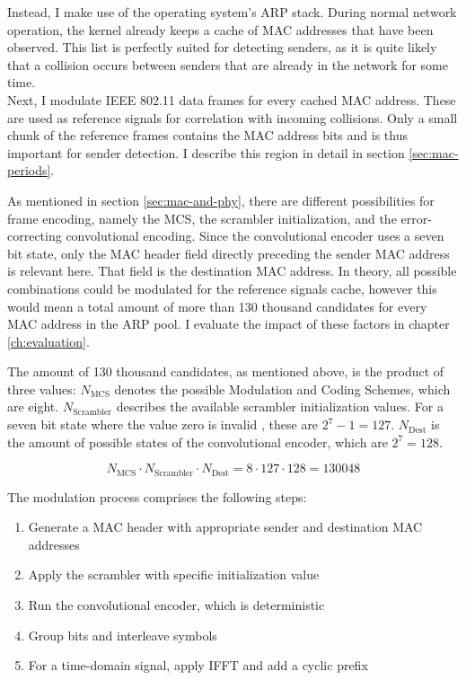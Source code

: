 Instead, I make use of the operating system's \gls{ARP} stack. During normal network operation, the kernel already keeps a cache of \gls{MAC} addresses that have been observed. This list is perfectly suited for detecting senders, as it is quite likely that a collision occurs between senders that are already in the network for some time.\\

Next, I modulate IEEE 802.11 data frames for every cached \gls{MAC} address. These are used as reference signals for correlation with incoming collisions. Only a small chunk of the reference frames contains the \gls{MAC} address bits and is thus important for sender detection. I describe this region in detail in section \ref{sec:mac-periods}.

As mentioned in section \ref{sec:mac-and-phy}, there are different possibilities for frame encoding, namely the \gls{MCS}, the scrambler initialization, and the error-correcting convolutional encoding. Since the convolutional encoder uses a seven bit state, only the \gls{MAC} header field directly preceding the sender \gls{MAC} address is relevant here. That field is the destination \gls{MAC} address. In theory, all possible combinations could be modulated for the reference signals cache, however this would mean a total amount of  more than 130 thousand candidates for every \gls{MAC} address in the ARP pool. I evaluate the impact of these factors in chapter \ref{ch:evaluation}.

The amount of 130 thousand candidates, as mentioned above, is the product of three values: $ N_{\text{MCS}} $ denotes the possible Modulation and Coding Schemes, which are eight. $ N_{\text{Scrambler}} $ describes the available scrambler initialization values. For a seven bit state where the value zero is invalid \cite{ieee2012}, these are $ 2^7 - 1 = 127 $. $ N_{\text{Dest}} $ is the amount of possible states of the convolutional encoder, which are $ 2^7 = 128 $.

$$ N_{\text{MCS}} \cdot N_{\text{Scrambler}} \cdot N_{\text{Dest}} = 8 \cdot 127 \cdot 128 = 130 048 $$\vspace{0cm}

The modulation process comprises the following steps:

\begin{enumerate}
	\item Generate a \gls{MAC} header with appropriate sender and destination \gls{MAC} addresses
	\item Apply the scrambler with specific initialization value
	\item Run the convolutional encoder, which is deterministic
	\item Group bits and interleave symbols
	\item For a time-domain signal, apply \gls{IFFT} and add a cyclic prefix
\end{enumerate}

